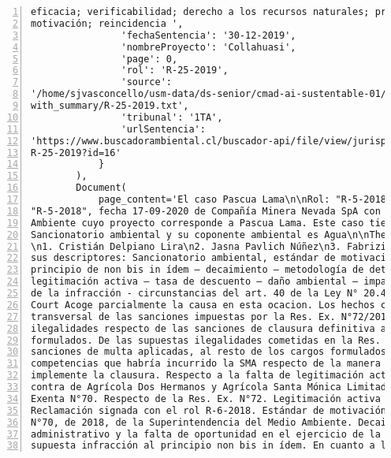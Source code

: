 \begin{Verbatim}[frame=lines, label=Elavoración propia -  Ejemplo de Contexto enviado por el Chatbot a OpenAI
				, fontsize=\footnotesize, numbers=left
				, baselinestretch=0.4
				, formatcom=\color{gray}]
eficacia; verificabilidad; derecho a los recursos naturales; principio de participación;
motivación; reincidencia ',
                'fechaSentencia': '30-12-2019',
                'nombreProyecto': 'Collahuasi',
                'page': 0,
                'rol': 'R-25-2019',
                'source':
'/home/sjvasconcello/usm-data/ds-senior/cmad-ai-sustentable-01/etl/load/../../data/clean/docs_
with_summary/R-25-2019.txt',
                'tribunal': '1TA',
                'urlSentencia':
'https://www.buscadorambiental.cl/buscador-api/file/view/jurisprudencia/S1TA Rol N°
R-25-2019?id=16'
            }
        ),
        Document(
            page_content='El caso Pascua Lama\n\nRol: "R-5-2018", Rol: "R-5-2018",Rol:
"R-5-2018", fecha 17-09-2020 de Compañía Minera Nevada SpA con Superintendencia del Medio
Ambiente cuyo proyecto corresponde a Pascua Lama. Este caso tiene como principal materia
Sancionatorio ambiental y su coponente ambiental es Agua\n\nThe integration ministers are:
\n1. Cristián Delpiano Lira\n2. Jasna Pavlich Núñez\n3. Fabrizio Queirolo Pellerano\n\nSiendo
sus descriptores: Sancionatorio ambiental, estándar de motivación – proporcionalidad –
principio de non bis in ídem – decaimiento – metodología de determinación de sanciones –
legitimación activa – tasa de descuento – daño ambiental – impacto ambiental – clasificación
de la infracción - circunstancias del art. 40 de la Ley N° 20.417\n\nEl First Environmental
Court Acoge parcialmente la causa en esta ocacion. Los hechos controvertidos son: Ilegalidad
transversal de las sanciones impuestas por la Res. Ex. N°72/2018. De las supuestas
ilegalidades respecto de las sanciones de clausura definitiva aplicadas a cinco de los cargos
formulados. De las supuestas ilegalidades cometidas en la Res. Ex. N°72/2018, respecto de las
sanciones de multa aplicadas, al resto de los cargos formulados. Del supuesto exceso en las
competencias que habría incurrido la SMA respecto de la manera en que pretende que se
implemente la clausura. Respecto a la falta de legitimación activa alegada por la SMA en
contra de Agrícola Dos Hermanos y Agrícola Santa Mónica Limitada. Respecto de la Resolución
Exenta N°70. Respecto de la Res. Ex. N°72. Legitimación activa de los reclamantes de la
Reclamación signada con el rol R-6-2018. Estándar de motivación exigido. Resolución Exenta
N°70, de 2018, de la Superintendencia del Medio Ambiente. Decaimiento del procedimiento
administrativo y la falta de oportunidad en el ejercicio de la potestad sancionatorio. De la
supuesta infracción al principio non bis in ídem. En cuanto a la metodología para la

\end{Verbatim}
